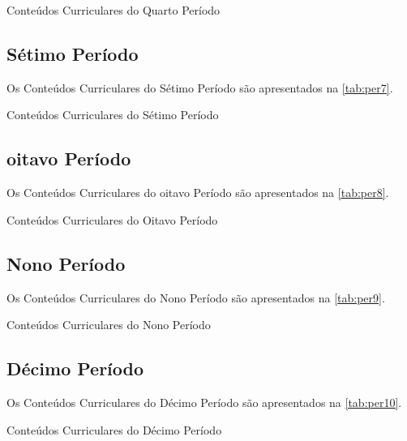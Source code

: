 \begin{table}[htb!]
	\centering\tiny
	\caption{Conteúdos Curriculares do Quarto Período}
	\label{tab:per6}
	
	
\end{table}

\subsection{Sétimo Período}
\label{sub:setimo}

Os Conteúdos Curriculares do Sétimo Período são apresentados na \autoref{tab:per7}.

\begin{table}[htb!]
	\centering\tiny
	\caption{Conteúdos Curriculares do Sétimo Período}
	\label{tab:per7}
	
	
\end{table}

\subsection{oitavo Período}
\label{sub:oitavo}

Os Conteúdos Curriculares do oitavo Período são apresentados na \autoref{tab:per8}.

\begin{table}[htb!]
	\centering\tiny
	\caption{Conteúdos Curriculares do Oitavo Período}
	\label{tab:per8}
	
	
\end{table}

\subsection{Nono Período}
\label{sub:nono}

Os Conteúdos Curriculares do Nono Período são apresentados na \autoref{tab:per9}.

\begin{table}[htb!]
	\centering\tiny
	\caption{Conteúdos Curriculares do Nono Período}
	\label{tab:per9}
	
	
\end{table}

\subsection{Décimo Período}
\label{sub:decimo}

Os Conteúdos Curriculares do Décimo Período são apresentados na \autoref{tab:per10}.

\begin{table}[htb!]
	\centering\tiny
	\caption{Conteúdos Curriculares do Décimo Período}
	\label{tab:per10}
	
	
\end{table}